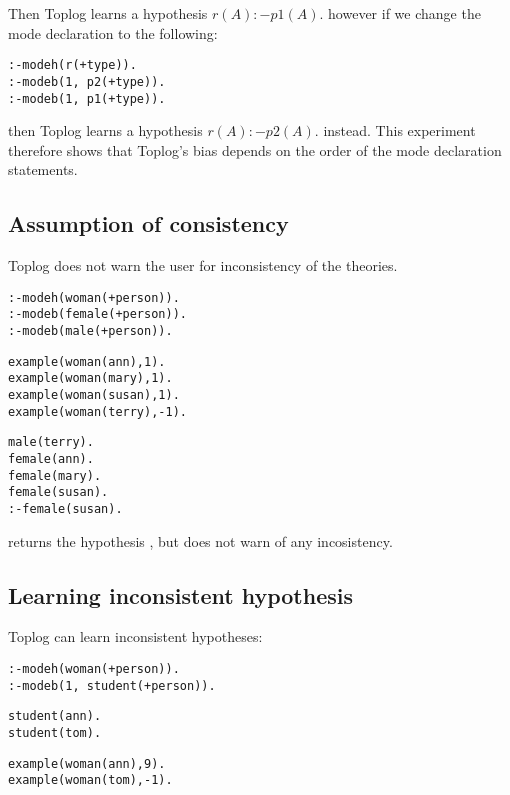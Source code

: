 Then Toplog learns a hypothesis $r(A) :- p1(A).$ however if we change the mode declaration to the following:
\begin{lstlisting}
:-modeh(r(+type)).
:-modeb(1, p2(+type)).
:-modeb(1, p1(+type)).
\end{lstlisting}
then Toplog learns a hypothesis $r(A) :- p2(A).$ instead. This experiment therefore shows that Toplog's bias depends on the order of the mode declaration statements.

\subsection{Assumption of consistency}\label{toplog_consistency_assumption}
Toplog does not warn the user for inconsistency of the theories.

\begin{minipage}[t]{.30\textwidth}
\begin{lstlisting}
:-modeh(woman(+person)).
:-modeb(female(+person)).
:-modeb(male(+person)).
\end{lstlisting}
\end{minipage}
\begin{minipage}[t]{.35\textwidth}
\begin{lstlisting}
example(woman(ann),1).
example(woman(mary),1).
example(woman(susan),1).
example(woman(terry),-1).
\end{lstlisting}
\end{minipage}
\begin{minipage}[t]{.30\textwidth}
\begin{lstlisting}
male(terry).
female(ann).
female(mary).
female(susan).
:-female(susan).
\end{lstlisting}
\end{minipage}

returns the hypothesis , but does not warn of any incosistency.

\subsection{Learning inconsistent hypothesis}\label{toplog_inconsistent_hypothesis}
Toplog can learn inconsistent hypotheses:

\begin{minipage}[t]{.40\textwidth}
\begin{lstlisting}
:-modeh(woman(+person)).
:-modeb(1, student(+person)).
\end{lstlisting}
\end{minipage}
\begin{minipage}[t]{.20\textwidth}
\begin{lstlisting}
student(ann).
student(tom).
\end{lstlisting}
\end{minipage}
\begin{minipage}[t]{.20\textwidth}
\begin{lstlisting}
example(woman(ann),9).
example(woman(tom),-1).
\end{lstlisting}
\end{minipage}


